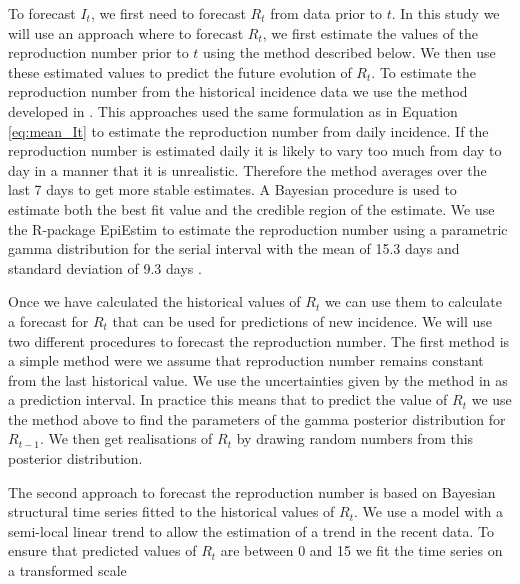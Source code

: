 \documentclass[12pt]{article}
\begin{document}

To forecast $I_t$, we first need to forecast $R_t$ from data prior to $t$. In this study we will use an approach where to forecast $R_t$, we first estimate the values of the reproduction number prior to $t$ using the method described below. We then use these estimated values to predict the future evolution of $R_t$. To estimate the reproduction number from the historical incidence data we use the method developed in \cite{coriNewFrameworkSoftware2013,thompsonImprovedInferenceTimevarying2019}. This approaches used the same formulation as in Equation \ref{eq:mean_It} to estimate the reproduction number from daily incidence. If the reproduction number is estimated daily it is likely to vary too much from day to day in a manner that it is unrealistic. Therefore the method averages over the last 7 days to get more stable estimates. A Bayesian procedure is used to estimate both the best fit value and the credible region of the estimate. We use the R-package EpiEstim \cite{coriEpiEstimEpiEstimPackage2013} to estimate the reproduction number using a parametric gamma distribution for the serial interval with the mean of 15.3 days and standard deviation of 9.3 days \cite{whoebolaresponseteamEbolaVirusDisease2014}.

Once we have calculated the historical values of $R_t$ we can use them to calculate a forecast for $R_t$ that can be used for predictions of new incidence. We will use two different procedures to forecast the reproduction number. The first method is a simple method were we assume that reproduction number remains constant from the last historical value. We use the uncertainties given by the method in \cite{coriNewFrameworkSoftware2013} as a prediction interval. In practice this means that to predict the value of $R_t$ we use the method above to find the parameters of the gamma posterior distribution for $R_{t-1}$. We then get realisations of $R_t$ by drawing random numbers from this posterior distribution. 

The second approach to forecast the reproduction number is based on Bayesian structural time series fitted to the historical values of $R_t$. We use a model with a semi-local linear trend to allow the estimation of a trend in the recent data. To ensure that predicted values of $R_t$ are between 0 and 15 we fit the time series on a transformed scale
\end{document}
